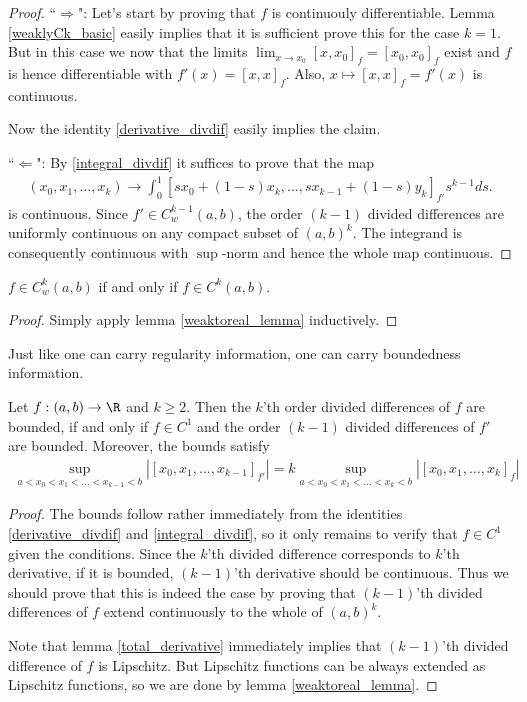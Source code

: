 \begin{proof}

	``$\Rightarrow$": Let's start by proving that $f$ is continuouly differentiable. Lemma \ref{weaklyCk_basic} easily implies that it is sufficient prove this for the case $k = 1$. But in this case we now that the limits $\lim_{x \to x_{0}} [x, x_{0}]_{f} = [x_{0}, x_{0}]_{f}$ exist and $f$ is hence differentiable with $f'(x) = [x, x]_{f}$. Also, $x \mapsto [x, x]_{f} = f'(x)$ is continuous.

	Now the identity \ref{derivative_divdif} easily implies the claim.

	``$\Leftarrow$": By \ref{integral_divdif} it suffices to prove that the map
	\begin{align*}
		(x_{0}, x_{1}, \ldots, x_{k}) \to \int_{0}^{1}[s x_{0} + (1 - s) x_{k}, \ldots, s x_{k - 1} + (1 - s) y_{k}]_{f'} s^{k - 1} d s.
	\end{align*}
	is continuous. Since $f' \in C_{w}^{k - 1}(a, b)$, the order $(k - 1)$ divided differences are uniformly continuous on any compact subset of $(a, b)^{k}$. The integrand is consequently continuous with $\sup$-norm and hence the whole map continuous.
\end{proof}

\begin{kor}
	$f \in C_{w}^{k}(a, b)$ if and only if $f \in C^{k}(a, b)$.
\end{kor}
\begin{proof}
	Simply apply lemma \ref{weaktoreal_lemma} inductively.
\end{proof}

Just like one can carry regularity information, one can carry boundedness information.

\begin{lem}\label{boundtoreal_lemma}
	Let $f : (a, b) \to \R$ and $k \geq 2$. Then the $k$'th order divided differences of $f$ are bounded, if and only if $f \in C^{1}$ and the order $(k - 1)$ divided differences of $f'$ are bounded. Moreover, the bounds satisfy
	\begin{align*}
		\sup_{a < x_{0} < x_{1} < \ldots < x_{k - 1} < b} |[x_{0}, x_{1}, \ldots, x_{k - 1}]_{f'}| = k \sup_{a < x_{0} < x_{1} < \ldots < x_{k}< b} |[x_{0}, x_{1}, \ldots, x_{k}]_{f}|
	\end{align*}
\end{lem}
\begin{proof}
	The bounds follow rather immediately from the identities \ref{derivative_divdif} and \ref{integral_divdif}, so it only remains to verify that $f \in C^{1}$ given the conditions. Since the $k$'th divided difference corresponds to $k$'th derivative, if it is bounded, $(k - 1)$'th derivative should be continuous. Thus we should prove that this is indeed the case by proving that $(k - 1)$'th divided differences of $f$ extend continuously to the whole of $(a, b)^{k}$.

	Note that lemma \ref{total_derivative} immediately implies that $(k - 1)$'th divided difference of $f$ is Lipschitz. But Lipschitz functions can be always extended as Lipschitz functions, so we are done by lemma \ref{weaktoreal_lemma}.
\end{proof}

